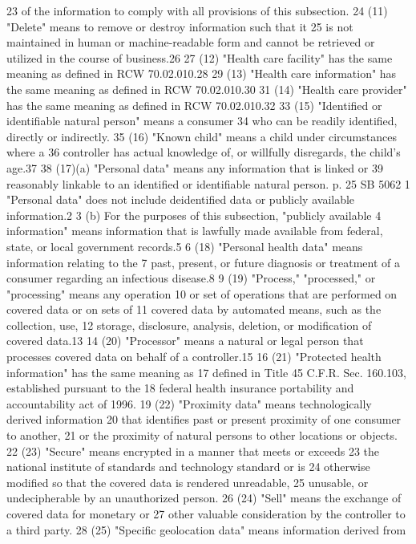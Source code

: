 23 of the information to comply with all provisions of this subsection.
24 (11) "Delete" means to remove or destroy information such that it
25 is not maintained in human or machine-readable form and cannot be
retrieved or utilized in the course of business.26
27 (12) "Health care facility" has the same meaning as defined in
RCW 70.02.010.28
29 (13) "Health care information" has the same meaning as defined in
RCW 70.02.010.30
31 (14) "Health care provider" has the same meaning as defined in
RCW 70.02.010.32
33 (15) "Identified or identifiable natural person" means a consumer
34 who can be readily identified, directly or indirectly.
35 (16) "Known child" means a child under circumstances where a
36 controller has actual knowledge of, or willfully disregards, the
child's age.37
38 (17)(a) "Personal data" means any information that is linked or
39 reasonably linkable to an identified or identifiable natural person.
p. 25 SB 5062
1 "Personal data" does not include deidentified data or publicly
available information.2
3 (b) For the purposes of this subsection, "publicly available
4 information" means information that is lawfully made available from
federal, state, or local government records.5
6 (18) "Personal health data" means information relating to the
7 past, present, or future diagnosis or treatment of a consumer
regarding an infectious disease.8
9 (19) "Process," "processed," or "processing" means any operation
10 or set of operations that are performed on covered data or on sets of
11 covered data by automated means, such as the collection, use,
12 storage, disclosure, analysis, deletion, or modification of covered
data.13
14 (20) "Processor" means a natural or legal person that processes
covered data on behalf of a controller.15
16 (21) "Protected health information" has the same meaning as
17 defined in Title 45 C.F.R. Sec. 160.103, established pursuant to the
18 federal health insurance portability and accountability act of 1996.
19 (22) "Proximity data" means technologically derived information
20 that identifies past or present proximity of one consumer to another,
21 or the proximity of natural persons to other locations or objects.
22 (23) "Secure" means encrypted in a manner that meets or exceeds
23 the national institute of standards and technology standard or is
24 otherwise modified so that the covered data is rendered unreadable,
25 unusable, or undecipherable by an unauthorized person.
26 (24) "Sell" means the exchange of covered data for monetary or
27 other valuable consideration by the controller to a third party.
28 (25) "Specific geolocation data" means information derived from
